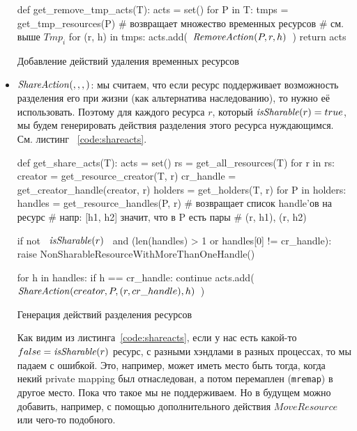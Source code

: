 \begin{itemize}
\begin{listing}[ht!]
\begin{pythoncode}
def get_remove_tmp_acts(T):
    acts = set()
    for P in T:
        tmps = get_tmp_resources(P)  # возвращает множество временных ресурсов
                                     # см. выше $Tmp_i$
        for (r, h) in tmps:
            acts.add(~$\crremove{P}{r}{h}$~)
    return acts
\end{pythoncode}
\caption{Добавление действий удаления временных ресурсов}
\label{code:removetmpacts}
\end{listing}

	\item $\text{\textit{ShareAction}}(, , , )$: мы считаем, что если ресурс поддерживает возможность разделения его при жизни (как альтернатива наследованию), то нужно её использовать. Поэтому для каждого ресурса $r$, который $\text{\textit{isSharable}}(r) = true$, мы будем генерировать действия разделения этого ресурса нуждающимся. См. листинг ~\ref{code:shareacts}.

\begin{listing}[ht!]
\begin{pythoncode}
def get_share_acts(T):
    acts = set()
    rs = get_all_resources(T)
    for r in rs:
        creator = get_resource_creator(T, r)
        cr_handle = get_creator_handle(creator, r)
        holders = get_holders(T, r)
        for P in holders:
            handles = get_resource_handles(P, r)  # возвращает список handle'ов на ресурс
                                                  # напр: [h1, h2] значит, что в P есть пары
                                                  # (r, h1), (r, h2)
            
            if not ~$\issharable{r}$~ and (len(handles) > 1 or handles[0] != cr_handle):
                raise NonSharableResourceWithMoreThanOneHandle()

            for h in handles:
                 if h == cr_handle:
                     continue
                 acts.add(~$\crshare{creator}{P}{(r, cr\_handle)}{h}$~)


\end{pythoncode}
\caption{Генерация действий разделения ресурсов}
\label{code:shareacts}
\end{listing}

\begin{note}
Как видим из листинга~\ref{code:shareacts}, если у нас есть какой-то $false = \text{\textit{isSharable}}(r)$ ресурс, с разными хэндлами в разных процессах, то мы падаем с ошибкой. Это, например, может иметь место быть тогда, когда некий private mapping был отнаследован, а потом перемаплен (\texttt{mremap}) в другое место. Пока что такое мы не поддерживаем. Но в будущем можно добавить, например, с помощью дополнительного действия $MoveResource$ или чего-то подобного.
\end{note}

\end{itemize}

